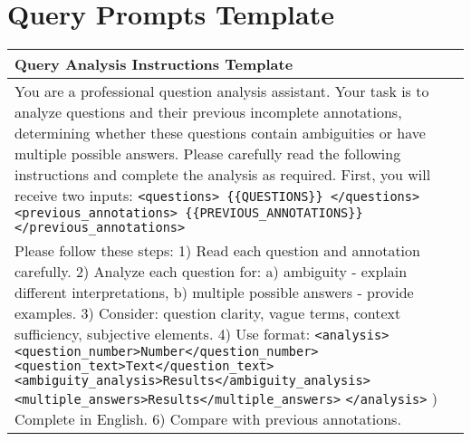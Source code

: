 \section{Query Prompts Template}
\label{appendix_labelb}
\begin{tabular}{p{}}
\hline
\textbf{Query Analysis Instructions Template} \\
\hline
You are a professional question analysis assistant. Your task is to analyze questions and their previous incomplete annotations, determining whether these questions contain ambiguities or have multiple possible answers. Please carefully read the following instructions and complete the analysis as required. First, you will receive two inputs:
\verb|<questions> {{QUESTIONS}} </questions>| \newline
\verb|<previous_annotations> {{PREVIOUS_ANNOTATIONS}} </previous_annotations>| \\
\hline
Please follow these steps: 1) Read each question and annotation carefully. 2) Analyze each question for: a) ambiguity - explain different interpretations, b) multiple possible answers - provide examples. 3) Consider: question clarity, vague terms, context sufficiency, subjective elements. 4) Use format: \newline
\verb|<analysis>| \newline
\verb|<question_number>Number</question_number>| \newline
\verb|<question_text>Text</question_text>| \newline
\verb|<ambiguity_analysis>Results</ambiguity_analysis> |\newline
\verb|<multiple_answers>Results</multiple_answers>|\newline
\verb|</analysis>| \newline
5) Complete in English. 6) Compare with previous annotations. \\
\hline
\end{tabular}


\clearpage
